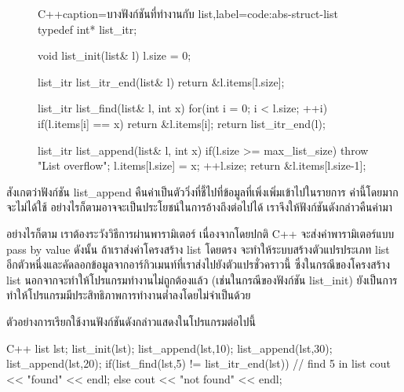 \begin{figure}
\latintext
\begin{codelist}{C++}{caption={\thaitext บาง{\wbr}ฟังก์ชัน{\wbr}ที่ทำงาน{\wbr}กับ {\ct list}\latintext},label=code:abs-struct-list}
typedef int* list_itr;

void list_init(list& l)
{
  l.size = 0;
}

list_itr list_itr_end(list& l)
{
  return &l.items[l.size];
}

list_itr list_find(list& l, int x)
{
  for(int i = 0; i < l.size; ++i)
    if(l.items[i] == x)
      return &l.items[i];
  return list_itr_end(l);
}

list_itr list_append(list& l, int x)
{
  if(l.size >= max_list_size)
    throw "List overflow";
  l.items[l.size] = x;
  ++l.size;
  return &l.items[l.size-1];
}
\end{codelist}
\thaitext
\end{figure}

สังเกต{\wbr}ว่า{\wbr}ฟังก์ชัน {\ct list\_append}
คืน{\wbr}ค่า{\wbr}เป็น{\wbr}ตัว{\wbr}วิ่ง{\wbr}ที่{\wbr}ชี้{\wbr}ไป{\wbr}ที่{\wbr}ข้อมูล{\wbr}ที่{\wbr}เพิ่ง{\wbr}เพิ่ม{\wbr}เข้า{\wbr}ไป{\wbr}ใน{\wbr}รายการ ค่า{\wbr}นี้{\wbr}โดยมาก{\wbr}จะ{\wbr}ไม่{\wbr}ได้{\wbr}ใช้{\wbr}
อย่างไรก็ตาม{\wbr}อาจ{\wbr}จะ{\wbr}เป็น{\wbr}ประโยชน์{\wbr}ใน{\wbr}การ{\wbr}อ้าง{\wbr}ถึง{\wbr}ต่อไป{\wbr}ได้ เรา{\wbr}จึง{\wbr}ให้{\wbr}ฟังก์ชัน{\wbr}ดังกล่าว{\wbr}คืน{\wbr}ค่า{\wbr}มา{\wbr}

อย่างไรก็ตาม เรา{\wbr}ต้อง{\wbr}ระวัง{\wbr}วิธีการ{\wbr}ผ่าน{\wbr}พารามิเตอร์ เนื่องจาก{\wbr}โดย{\wbr}ปกติ C++
จะ{\wbr}ส่ง{\wbr}ค่า{\wbr}พารามิเตอร์{\wbr}แบบ pass by value ดังนั้น ถ้า{\wbr}เรา{\wbr}ส่ง{\wbr}ค่า{\wbr}โครงสร้าง {\ct list}
โดย{\wbr}ตรง จะ{\wbr}ทำ{\wbr}ให้{\wbr}ระบบ{\wbr}สร้าง{\wbr}ตัวแปร{\wbr}ประเภท {\ct list}
อีก{\wbr}ตัว{\wbr}หนึ่ง{\wbr}และ{\wbr}คัดลอก{\wbr}ข้อมูล{\wbr}จาก{\wbr}อาร์กิวเมนท์{\wbr}ที่{\wbr}เรา{\wbr}ส่ง{\wbr}ไป{\wbr}ยัง{\wbr}ตัวแปร{\wbr}ชั่ว{\wbr}คราวนี้{\wbr}
ซึ่ง{\wbr}ใน{\wbr}กรณี{\wbr}ของ{\wbr}โครงสร้าง {\ct list} นอกจาก{\wbr}จะ{\wbr}ทำ{\wbr}ให้{\wbr}โปรแกรม{\wbr}ทำงาน{\wbr}ไม่{\wbr}ถูกต้อง{\wbr}แล้ว{\wbr}
(เช่น{\wbr}ใน{\wbr}กรณี{\wbr}ของ{\wbr}ฟังก์ชัน {\ct list\_init})
ยัง{\wbr}เป็น{\wbr}การ{\wbr}ทำ{\wbr}ให้{\wbr}โปรแกรม{\wbr}มี{\wbr}ประสิทธิภาพ{\wbr}การ{\wbr}ทำงาน{\wbr}ต่ำ{\wbr}ลง{\wbr}โดย{\wbr}ไม่{\wbr}จำเป็น{\wbr}ด้วย{\wbr}

ตัวอย่าง{\wbr}การ{\wbr}เรียก{\wbr}ใช้{\wbr}งาน{\wbr}ฟังก์ชัน{\wbr}ดังกล่าว{\wbr}แสดง{\wbr}ใน{\wbr}โปรแกรม{\wbr}ต่อไปนี้{\wbr}

\latintext
\begin{codelist}{C++}{}
  list lst;
  list_init(lst);
  list_append(lst,10);  list_append(lst,30);  list_append(lst,20);
  if(list_find(lst,5) != list_itr_end(lst))  // find 5 in list
    cout << "found" << endl;
  else
    cout << "not found" << endl;
\end{codelist}
\thaitext

